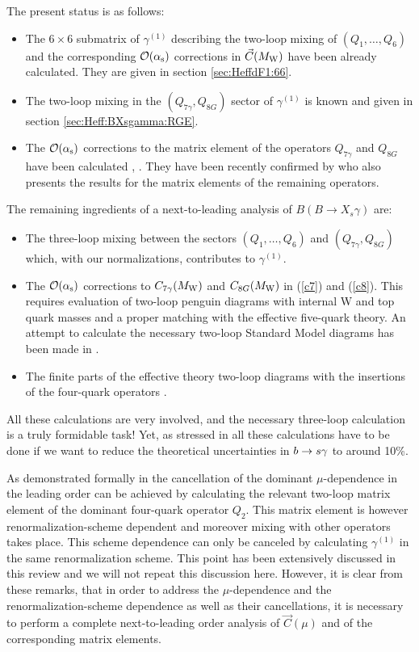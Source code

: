 \noindent
The present status is as follows:
\begin{itemize}
\item
The $6 \times 6$ submatrix of
$\gamma^{(1)}$ describing the two-loop mixing of $(Q_1,\ldots,
Q_6)$ and the corresponding ${\cal{O}}(\alpha_{\rm s})$ corrections in
$\vec{C}(M_{\rm W})$ have been already calculated. They are given in section
\ref{sec:HeffdF1:66}.
\item
The two-loop mixing in the $(Q_{7\gamma},Q_{8G})$ sector of
$\gamma^{(1)}$ is known \cite{misiakmuenz:95} and given in
section \ref{sec:Heff:BXsgamma:RGE}.
\item
The ${\cal{O}}(\alpha_{\rm s})$ corrections to the matrix element
of the operators $Q_{7\gamma}$ and $Q_{8G}$ have 
been calculated \cite{aligreub:91a}, \cite{aligreub:91b}.
They have been recently confirmed by \cite{pott:95} who also presents
the results for the matrix elements of the remaining operators.
\end{itemize}
The remaining ingredients of a next-to-leading analysis of
$B(B \to X_s \gamma)$ are:
\begin{itemize}
\item
The three-loop mixing between the sectors $(Q_1,\ldots,Q_6)$ and
$(Q_{7\gamma},Q_{8G})$ which, with our normalizations, contributes to
$\gamma^{(1)}$.\\
\item
The ${\cal O}(\alpha_{\rm s})$ corrections to $C_{7\gamma}(M_{\rm W})$ and $C_{8G}(M_{\rm W})$
in (\ref{c7}) and (\ref{c8}). This requires evaluation of two-loop
penguin diagrams with internal W and top quark masses and a proper
matching with the effective five-quark theory. An attempt to calculate
the necessary two-loop Standard Model diagrams has been made in \cite{Yao2}.
\item
The finite parts of the effective theory two-loop diagrams with the
insertions of the four-quark operators .
\end{itemize}
All these calculations are very involved, and the necessary three-loop
calculation is a truly formidable task! Yet, as stressed in
\cite{BMMP:94} all these calculations have to be done if we want to
reduce the theoretical uncertainties in $b \to s \gamma$ to around 10\%.

As demonstrated formally in \cite{BMMP:94} the cancellation of the
dominant $\mu$-dependence in the leading order can be achieved by
calculating the relevant two-loop matrix element of the dominant
four-quark operator $Q_2$.  This matrix element is however
renormalization-scheme dependent and moreover mixing with other
operators takes place.  This scheme dependence can only be canceled by
calculating $\gamma^{(1)}$ in the same renormalization scheme.
This point has been extensively discussed in this review
and  we will not repeat this discussion here. However,
it is clear from these remarks, that in order to address the
$\mu$-dependence and the renormalization-scheme dependence as well as
their cancellations, it is necessary to perform a complete
next-to-leading order analysis of $\vec{C}(\mu)$ and of the corresponding
matrix elements.

